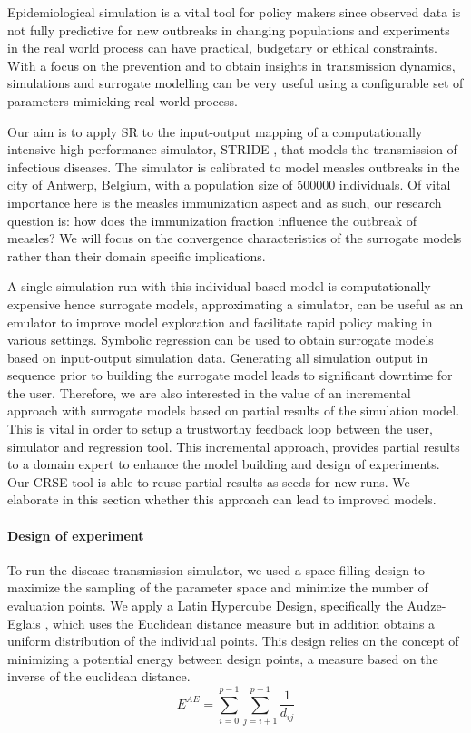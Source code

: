 
 
Epidemiological simulation is a vital tool for policy makers since observed data is not fully predictive for new outbreaks in changing populations and experiments in the real world process can have practical, budgetary or ethical constraints. With a focus on the prevention and to obtain insights in transmission dynamics, simulations and surrogate modelling can be very useful using a configurable set of parameters mimicking real world process.

Our aim is to apply SR to the input-output mapping of a computationally intensive high performance simulator, STRIDE \citep{stride}, that models the transmission of infectious diseases.
The simulator is calibrated to model measles outbreaks in the city of Antwerp, Belgium, with a population size of 500000 individuals. Of vital importance here is the measles immunization aspect and as such, our research question is: how does the immunization fraction influence the outbreak of measles?
We will focus on the convergence characteristics of the surrogate models rather than their domain specific implications. 

A single simulation run with this individual-based model is computationally expensive hence surrogate models, approximating a simulator, can be useful as an emulator to improve model exploration and facilitate rapid policy making in various settings. 
Symbolic regression can be used to obtain surrogate models based on input-output simulation data. Generating all simulation output in sequence prior to building the surrogate model leads to significant downtime for the user. 
Therefore, we are also interested in the value of an incremental approach with surrogate models based on partial results of the simulation model. This is vital in order to setup a trustworthy feedback loop between the user, simulator and regression tool. 
This incremental approach,  provides partial results to a domain expert to enhance the model building and design of experiments. Our CRSE tool is able to reuse partial results as seeds for new runs. We elaborate in this section whether this approach can lead to improved models.

\paragraph{Design of experiment}
To run the disease transmission simulator, we used a space filling design to maximize the sampling of the parameter space and minimize the number of evaluation points. We apply a Latin Hypercube Design, specifically the Audze-Eglais \citep{AudzeEglais, AudzeEglais2, AudzeEglais3}, which uses the Euclidean distance measure but in addition obtains a uniform distribution of the individual points. This design relies on the concept of minimizing a potential energy between design points, a measure based on the inverse of the euclidean distance.
\[
E^{AE} = \sum_{i=0}^{p-1} {\sum_{j=i+1}^{p-1} {\frac{1}{d_{ij}}}}
\]

